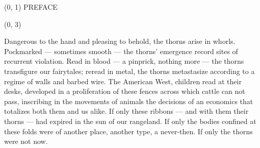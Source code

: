 \documentclass[10pt]{article}
\begin{document}
\begin{textblock}{23}(0, 1)
\center \huge PREFACE
\end{textblock}

\begin{textblock}{23}(0, 3)

Dangerous to the hand and pleasing to behold, the thorns arise in whorls.
Pockmarked --- sometimes smooth --- the thorns' emergence record sites of
recurrent violation. Read in blood --- a pinprick, nothing more --- the thorns
transfigure our fairytales; reread in metal, the thorns metastasize according
to a regime of walls and barbed wire. The American West, children read at their
desks, developed in a proliferation of these fences across which cattle can not
pass, inscribing in the movements of animals the decisions of an economics that
totalizes both them and us alike. If only these ribbons --- and with them their
thorns --- had expired in the sun of our rangeland. If only the bodies confined
at these folds were of another place, another type, a never-then. If only the
thorns were not now.

\end{textblock}
\end{document}
